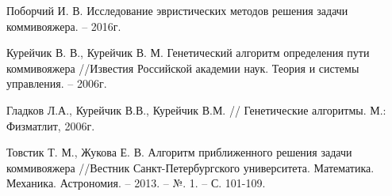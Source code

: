 \begin{thebibliography}{}
 Поборчий И. В. Исследование эвристических методов решения задачи коммивояжера. – 2016г.

 Курейчик В. В., Курейчик В. М. Генетический алгоритм определения пути коммивояжера //Известия Российской академии наук. Теория и системы управления. – 2006г.

 Гладков Л.А., Курейчик В.В., Курейчик В.М. // Генетические алгоритмы. М.:
Физматлит, 2006г.

 Товстик Т. М., Жукова Е. В. Алгоритм приближенного решения задачи коммивояжера //Вестник Санкт-Петербургского университета. Математика. Механика. Астрономия. – 2013. – №. 1. – С. 101-109.

\end{thebibliography}


